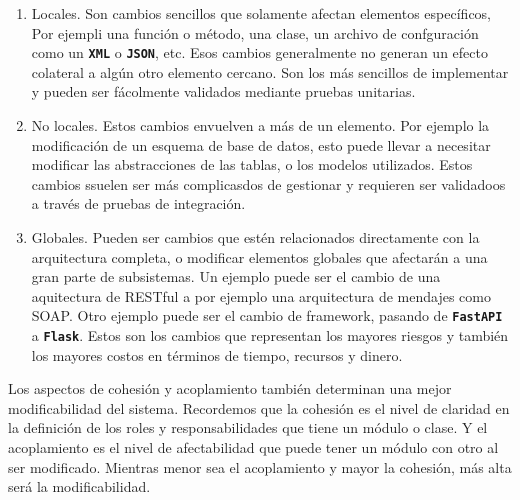 \begin{enumerate}
    \item Locales. Son cambios sencillos que solamente afectan elementos específicos, Por ejempli una función o método, una clase, un archivo de confguración como un \texttt{\textbf{XML}} o \texttt{\textbf{JSON}}, etc. Esos cambios generalmente no generan un efecto colateral a algún otro elemento cercano. Son los más sencillos de implementar y pueden ser fácolmente validados mediante pruebas unitarias.
    \item No locales. Estos cambios envuelven a más de un elemento. Por ejemplo la modificación de un esquema de base de datos, esto puede llevar a necesitar modificar las abstracciones de las tablas, o los modelos utilizados. Estos cambios ssuelen ser más complicasdos de gestionar y requieren ser validadoos a través de pruebas de integración.
    \item Globales. Pueden ser cambios que estén relacionados directamente con la arquitectura completa, o modificar elementos globales que afectarán a una gran parte de subsistemas. Un ejemplo puede ser el cambio de una aquitectura de RESTful a por ejemplo una arquitectura de mendajes como SOAP. Otro ejemplo puede ser el cambio de framework, pasando de \texttt{\textbf{FastAPI}} a \texttt{\textbf{Flask}}. Estos son los cambios que representan los mayores riesgos y también los mayores costos en términos de tiempo, recursos y dinero.
\end{enumerate}

Los aspectos de cohesión y acoplamiento también determinan una mejor modificabilidad del sistema. Recordemos que la cohesión es el nivel de claridad en la definición de los roles y responsabilidades que tiene un módulo o clase. Y el acoplamiento es el nivel de afectabilidad que puede tener un módulo con otro al ser modificado. Mientras menor sea el acoplamiento y mayor la cohesión, más alta será la modificabilidad.

